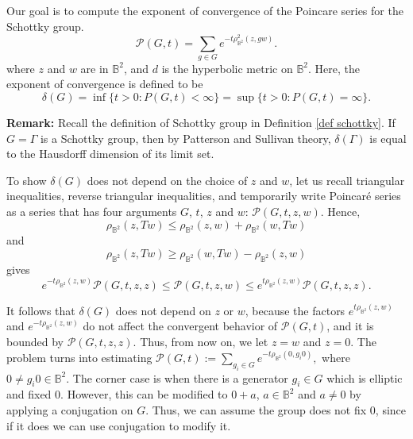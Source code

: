 \documentclass[12pt,oneside]{sfsuthesis}
\theoremstyle{plain} %
\theoremstyle{definition}  %
\theoremstyle{remark}  %
\theoremstyle{plain}
\begin{document}
{Our goal is to compute the exponent of convergence of the Poincare series for the Schottky group.
$$
\mathcal{P}(G,  t) = \sum_{g\in G} e^{-t \rho_{\mathbb{B}^2}^2(z,gw)}.
$$
where $z$ and $w$ are in $\mathbb{B}^2$, and $d$ is the  hyperbolic metric on ${\mathbb B}^2$. Here, the exponent of convergence is defined to be 
$$
\delta (G) = \inf \{t>0: P(G,t)<\infty\} =  \sup \{t>0: P(G, t) = \infty\}. 
$$

\textbf{Remark:} Recall the definition of Schottky group in Definition \ref{def schottky}. If $G=\Gamma$ is a Schottky group, then by Patterson and Sullivan theory, $\delta(\Gamma)$ is equal to the Hausdorff dimension of its limit set. 

To show $\delta(G)$ does not depend on the choice of $z$ and $w$, let us recall triangular inequalities, reverse triangular inequalities, and temporarily write Poincar\'{e} series as a series that has four arguments $G$, $t$, $z$ and $w$: $\mathcal{P}(G,t,z,w)$. Hence,
$$
\rho_{\mathbb{B}^2}(z,Tw)\leq \rho_{\mathbb{B}^2}(z,w)+\rho_{\mathbb{B}^2}(w,Tw)
$$
and 
$$
\rho_{\mathbb{B}^2}(z,Tw)\geq \rho_{\mathbb{B}^2}(w,Tw)-\rho_{\mathbb{B}^2}(z,w)
$$
gives
$$
e^{-t\rho_{\mathbb{B}^2}(z,w)}\mathcal{P}(G,t,z,z)\leq \mathcal{P}(G,t,z,w) \leq e^{t\rho_{\mathbb{B}^2}(z,w)}\mathcal{P}(G,t,z,z).
$$

It follows that $\delta(G)$ does not depend on $z$ or $w$, because the factors $e^{t\rho_{\mathbb{B}^2}(z,w)}$ and $e^{-t\rho_{\mathbb{B}^2}(z,w)}$ do not affect the convergent behavior of $\mathcal{P}(G,t)$, and it is bounded by $\mathcal{P}(G,t,z,z)$. Thus, from now on, we let $z=w$ and $z=0$. The problem turns into estimating $\mathcal{P}(G,t):= \sum\limits_{g_i\in G}e^{-t\rho_{\mathbb{B}^2}(0,g_i0)},$ where $0\neq g_i0\in\mathbb{B}^2$. The corner case is when there is a generator $g_i\in G$ which is elliptic and fixed $0$. However, this can be modified to $0+a$, $a\in\mathbb{B}^2$ and $a\neq 0$ by applying a conjugation on $G$. Thus, we can assume the group does not fix $0$, since if it does we can use conjugation to modify it.





}
\end{document}
